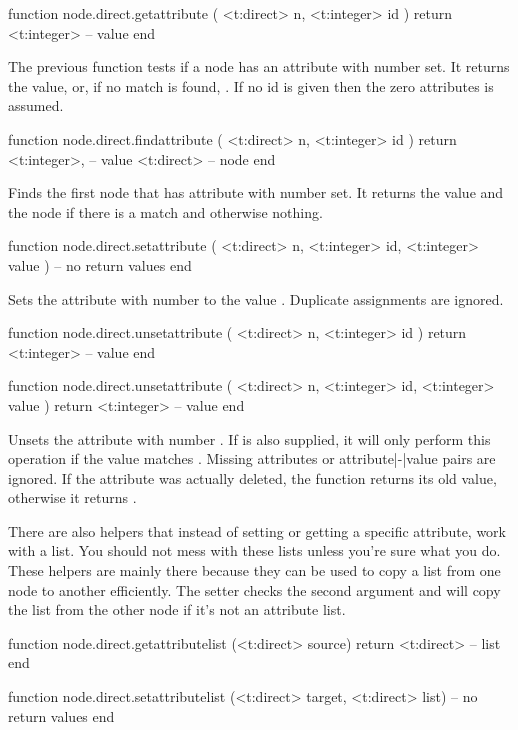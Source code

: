 \starttyping[option=LUA]
function node.direct.getattribute ( <t:direct> n, <t:integer> id )
    return <t:integer> -- value
end
\stoptyping

The previous function tests if a node has an attribute with number 
set. It returns the value, or, if no match is found, . If no \type
{id} is given then the zero attributes is assumed.

\starttyping[option=LUA]
function node.direct.findattribute ( <t:direct> n, <t:integer> id )
    return
        <t:integer>, -- value
        <t:direct>   -- node
end
\stoptyping

Finds the first node that has attribute with number  set. It returns
the value and the node if there is a match and otherwise nothing.

\starttyping[option=LUA]
function node.direct.setattribute ( <t:direct> n, <t:integer> id, <t:integer> value )
    -- no return values
end
\stoptyping

Sets the attribute with number  to the value . Duplicate
assignments are ignored.

\starttyping[option=LUA]
function node.direct.unsetattribute ( <t:direct> n, <t:integer> id )
    return <t:integer> -- value
end

function node.direct.unsetattribute ( <t:direct> n, <t:integer> id, <t:integer> value )
    return <t:integer> -- value
end
\stoptyping

Unsets the attribute with number . If  is also supplied,
it will only perform this operation if the value matches . Missing
attributes or attribute|-|value pairs are ignored. If the attribute was actually
deleted, the function returns its old value, otherwise it returns .

There are also helpers that instead of setting or getting a specific attribute,
work with a list. You should not mess with these lists unless you're sure what
you do. These helpers are mainly there because they can be used to copy a list
from one node to another efficiently. The setter checks the second argument and
will copy the list from the other node if it's not an attribute list.

\starttyping[option=LUA]
function node.direct.getattributelist (<t:direct> source)
    return <t:direct> -- list
end

function node.direct.setattributelist (<t:direct> target, <t:direct> list)
    -- no return values
end

